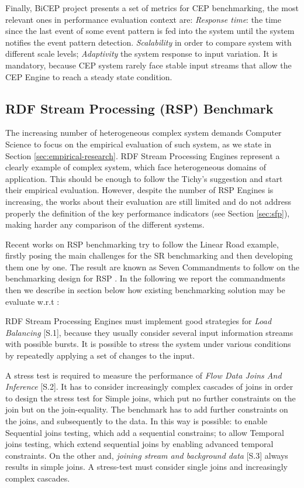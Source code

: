 Finally, BiCEP project presents a set of metrics for CEP benchmarking, the most relevant ones in performance evaluation context are: \textit{Response time}: the time since the last event of some event pattern is fed into the system until the system notifies the event pattern detection. \textit{Scalability} in order to compare system with different scale levels; \textit{Adaptivity} the system response to input variation. It is mandatory, because CEP system rarely face stable input streams that allow the CEP Engine to reach a steady state condition.

\subsection{RDF Stream Processing (RSP) Benchmark}\label{sec:sr-benchmarking}

The increasing number of heterogeneous complex system demands Computer Science to focus on the empirical evaluation of such system, as we state in Section \ref{sec:empirical-research}. RDF Stream Processing Engines represent a clearly example of complex system, which face heterogeneous domains of application. This should be enough to follow the Tichy's suggestion and start their empirical evaluation. However, despite the number of RSP Engines is increasing, the works about their evaluation are still limited and do not address properly the definition of the key performance indicators (see Section \ref{sec:sfp}), making harder any comparison of  the different systems.

Recent works on RSP benchmarking try to follow the Linear Road example, firstly posing the main challenges for the SR benchmarking  and then developing them one by one. The result are known as Seven Commandments to follow on the benchmarking design for RSP \cite{DBLP:conf/esws/ScharrenbachUMVB13}. In the following we report the commandments then we describe in section below how existing benchmarking solution may be evaluate w.r.t \cite{DBLP:conf/esws/ScharrenbachUMVB13}:
 
RDF Stream Processing Engines must implement good strategies for \textit{Load Balancing} [S.1], because they usually consider several input information streams with possible bursts. It is possible to stress the system under various conditions by repeatedly applying a set of changes to the input.

A stress test is required to measure the performance of \textit{Flow Data Joins And Inference} [S.2]. It has to consider increasingly complex cascades of joins in order to design the stress test for Simple joins, which put no further constraints on the join but on the join-equality. The benchmark has to add further constraints on the joins, and subsequently to the data. In this way is possible: to enable Sequential joins testing, which add a sequential constrains;  to allow Temporal joins testing, which extend sequential joins by enabling advanced temporal constraints. On the other and, \textit{joining stream and background data} [S.3] always results in simple joins. A stress-test must consider single joins and increasingly complex cascades.

